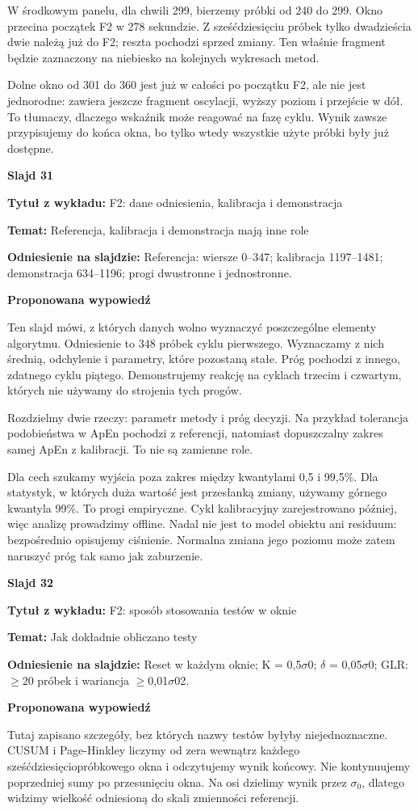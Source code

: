 \documentclass[a4paper,11pt]{article}
\newcommand{\NumerSlajdu}{1}
\newcommand{\Komentarz}[3]{%
  \gdef\NumerSlajdu{#1}%
  {\Large\bfseries Slajd #1\par}\smallskip
  \textbf{Tytuł z wykładu:} #2\par
  \textbf{Temat:} #3\par\medskip
}
\begin{document}
W środkowym panelu, dla chwili 299, bierzemy próbki od 240 do 299. Okno przecina początek F2 w 278 sekundzie. Z sześćdziesięciu próbek tylko dwadzieścia dwie należą już do F2; reszta pochodzi sprzed zmiany. Ten właśnie fragment będzie zaznaczony na niebiesko na kolejnych wykresach metod.

Dolne okno od 301 do 360 jest już w całości po początku F2, ale nie jest jednorodne: zawiera jeszcze fragment oscylacji, wyższy poziom i przejście w dół. To tłumaczy, dlaczego wskaźnik może reagować na fazę cyklu. Wynik zawsze przypisujemy do końca okna, bo tylko wtedy wszystkie użyte próbki były już dostępne.
\clearpage

\Komentarz{31}{F2: dane odniesienia, kalibracja i demonstracja}{Referencja, kalibracja i demonstracja mają inne role}
{\small\color{black!65}\textbf{Odniesienie na slajdzie:} Referencja: wiersze 0–347; kalibracja 1197–1481; demonstracja 634–1196; progi dwustronne i jednostronne.\par}
\medskip
\textbf{Proponowana wypowiedź}\par
Ten slajd mówi, z których danych wolno wyznaczyć poszczególne elementy algorytmu. Odniesienie to 348 próbek cyklu pierwszego. Wyznaczamy z nich średnią, odchylenie i parametry, które pozostaną stałe. Próg pochodzi z innego, zdatnego cyklu piątego. Demonstrujemy reakcję na cyklach trzecim i czwartym, których nie używamy do strojenia tych progów.

Rozdzielmy dwie rzeczy: parametr metody i próg decyzji. Na przykład tolerancja podobieństwa w ApEn pochodzi z referencji, natomiast dopuszczalny zakres samej ApEn z kalibracji. To nie są zamienne role.

Dla cech szukamy wyjścia poza zakres między kwantylami 0,5 i 99,5\%. Dla statystyk, w których duża wartość jest przesłanką zmiany, używamy górnego kwantyla 99\%. To progi empiryczne. Cykl kalibracyjny zarejestrowano później, więc analizę prowadzimy offline. Nadal nie jest to model obiektu ani residuum: bezpośrednio opisujemy ciśnienie. Normalna zmiana jego poziomu może zatem naruszyć próg tak samo jak zaburzenie.
\clearpage

\Komentarz{32}{F2: sposób stosowania testów w oknie}{Jak dokładnie obliczano testy}
{\small\color{black!65}\textbf{Odniesienie na slajdzie:} Reset w każdym oknie; K = 0,5\ensuremath{\sigma}0; \ensuremath{\delta} = 0,05\ensuremath{\sigma}0; GLR: \ensuremath{\geq}20 próbek i wariancja \ensuremath{\geq}0,01\ensuremath{\sigma}02.\par}
\medskip
\textbf{Proponowana wypowiedź}\par
Tutaj zapisano szczegóły, bez których nazwy testów byłyby niejednoznaczne. CUSUM i Page-Hinkley liczymy od zera wewnątrz każdego sześćdziesięciopróbkowego okna i odczytujemy wynik końcowy. Nie kontynuujemy poprzedniej sumy po przesunięciu okna. Na osi dzielimy wynik przez $\sigma_0$, dlatego widzimy wielkość odniesioną do skali zmienności referencji.
\end{document}
